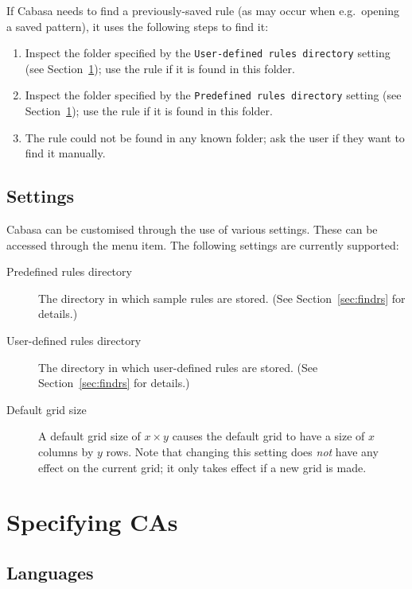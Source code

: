 \documentclass[oneside,a4paper]{memoir}
\begin{document}
If Cabasa needs to find a previously-saved rule (as may occur when e.g.\ opening a saved pattern),
  it uses the following steps to find it:

\begin{enumerate}
\item Inspect the folder specified by the \texttt{User-defined rules directory} setting (see Section~\ref{sec:sets});
  use the rule if it is found in this folder.
\item Inspect the folder specified by the \texttt{Predefined rules directory} setting (see Section~\ref{sec:sets});
  use the rule if it is found in this folder.
\item The rule could not be found in any known folder; ask the user if they want to find it manually.
\end{enumerate}

\section{Settings}
\label{sec:sets}

Cabasa can be customised through the use of various settings.
These can be accessed through the  menu item.
The following settings are currently supported:

\begin{description}
\item[Predefined rules directory]
  The directory in which sample rules are stored.
  (See Section~\ref{sec:findrs} for details.)
\item[User-defined rules directory]
  The directory in which user-defined rules are stored.
  (See Section~\ref{sec:findrs} for details.)
\item[Default grid size]
  A default grid size of $x \times y$ causes the default grid to have a size of $x$ columns by $y$ rows.
  Note that changing this setting does \textit{not} have any effect on the current grid;
    it only takes effect if a new grid is made.
\end{description}

\chapter{Specifying CAs}
\label{chap:speccas}

\section{Languages}
\label{sec:speclangs}
\end{document}
